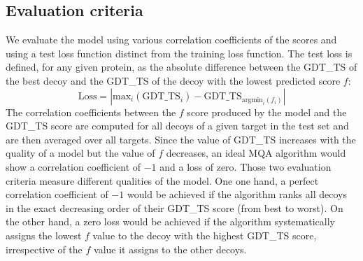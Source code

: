 \documentclass{bioinfo}
\begin{document}
\subsection{Evaluation criteria}
We evaluate the model using various correlation coefficients of the
scores and using a test loss function distinct from the training loss
function. The test loss is defined, for any given protein, as the
absolute difference between the GDT\_TS of the best decoy and the
GDT\_TS of the decoy with the lowest predicted score $f$:
\begin{equation}
\mathrm{Loss} = \left| \mathrm{max}_i(\text{GDT\_TS}_i) - \text{GDT\_TS}_{\mathrm{argmin}_i(f_i)} \right|
\end{equation}
The correlation coefficients between the $f$ score produced by the
model and the GDT\_TS score are computed for all decoys of a given
target in the test set and are then averaged over all targets. Since
the value of GDT\_TS increases with the quality of a model but the
value of $f$ decreases, an ideal MQA algorithm would show a correlation
coefficient of $-1$ and a loss of zero.
%
Those two evaluation criteria measure different qualities of the
model. One one hand, a perfect correlation coefficient of $-1$ would
be achieved if the algorithm ranks all decoys in the exact decreasing
order of their GDT\_TS score (from best to worst). On the other hand,
a zero loss would be achieved if the algorithm systematically assigns
the lowest $f$ value to the decoy with the highest GDT\_TS score,
irrespective of the $f$ value it assigns to the other decoys.
%
%
\end{document}
